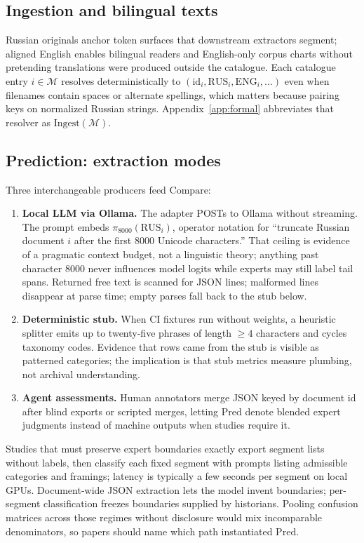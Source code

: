 \documentclass[11pt,a4paper]{article}
\theoremstyle{remark}
\newcommand{\Pred}{\mathrm{Pred}}
\begin{document}
\subsection{Ingestion and bilingual texts}
Russian originals anchor token surfaces that downstream extractors segment; aligned English enables bilingual readers and English-only corpus charts without pretending translations were produced outside the catalogue. Each catalogue entry $i\in\mathcal{M}$ resolves deterministically to $(\mathrm{id}_i,\mathrm{RUS}_i,\mathrm{ENG}_i,\ldots)$ even when filenames contain spaces or alternate spellings, which matters because pairing keys on normalized Russian strings. Appendix~\ref{app:formal} abbreviates that resolver as $\mathrm{Ingest}(\mathcal{M})$.

\subsection{Prediction: extraction modes}
Three interchangeable producers feed $\mathrm{Compare}$:
\begin{enumerate}[leftmargin=*]
  \item \textbf{Local LLM via Ollama.} The adapter POSTs to Ollama without streaming. The prompt embeds $\pi_{8000}(\mathrm{RUS}_i)$, operator notation for ``truncate Russian document $i$ after the first 8000 Unicode characters.'' That ceiling is evidence of a pragmatic context budget, not a linguistic theory; anything past character 8000 never influences model logits while experts may still label tail spans. Returned free text is scanned for JSON lines; malformed lines disappear at parse time; empty parses fall back to the stub below.
  \item \textbf{Deterministic stub.} When CI fixtures run without weights, a heuristic splitter emits up to twenty-five phrases of length $\ge 4$ characters and cycles taxonomy codes. Evidence that rows came from the stub is visible as patterned categories; the implication is that stub metrics measure plumbing, not archival understanding.
  \item \textbf{Agent assessments.} Human annotators merge JSON keyed by document id after blind exports or scripted merges, letting $\Pred$ denote blended expert judgments instead of machine outputs when studies require it.
\end{enumerate}

Studies that must preserve expert boundaries exactly export segment lists without labels, then classify each fixed segment with prompts listing admissible categories and framings; latency is typically a few seconds per segment on local GPUs. Document-wide JSON extraction lets the model invent boundaries; per-segment classification freezes boundaries supplied by historians. Pooling confusion matrices across those regimes without disclosure would mix incomparable denominators, so papers should name which path instantiated $\Pred$.
\end{document}
